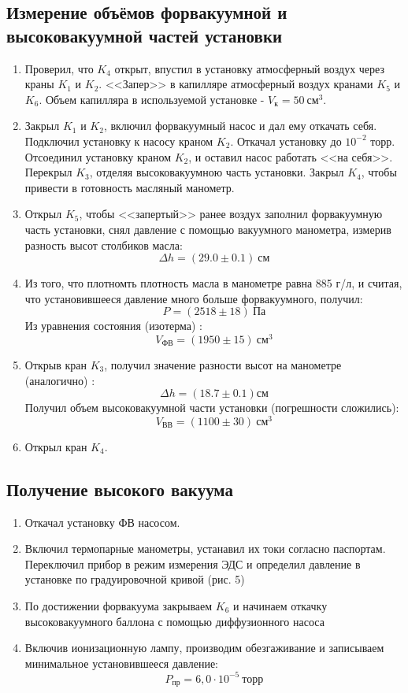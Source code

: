 \documentclass[12pt,a4paper]{article}
\begin{document}
\subsection*{Измерение объёмов форвакуумной и высоковакуумной частей установки}
    \begin{enumerate}
        \item Проверил, что $K_4$ открыт, впустил в установку атмосферный воздух через краны $K_1$ и $K_2$. <<Запер>> в капилляре атмосферный воздух кранами $K_5$ и $K_6$. Объем капилляра в используемой установке - $V_\text{к} = 50~ \text{см}^3.$
        \item Закрыл $K_1$ и $K_2$, включил форвакуумный насос и дал ему откачать себя. Подключил установку к насосу краном $K_2$. Откачал установку до $10^{-2}$ торр. Отсоединил установку краном $K_2$, и оставил насос работать <<на себя>>. Перекрыл  $K_3$, отделяя высоковакуумною часть установки. Закрыл $K_4$, чтобы привести в готовность масляный манометр.
        \item Открыл  $K_5$, чтобы <<запертый>> ранее воздух заполнил форвакуумную часть установки, снял давление с помощью вакуумного манометра, измерив разность высот столбиков масла:
        $$
        \Delta h = (29.0\pm0.1) ~\text{см}
        $$
        \item Из того, что плотномть плотность масла в манометре равна 885 г/л, и считая, что установившееся давление много больше форвакуумного, получил:
        $$
        P = (2518\pm18)~\text{Па}
        $$
        Из уравнения состояния (изотерма) :
        $$
        V_\text{ФВ} = (1950\pm15)~\text{см}^3
        $$
        \item Открыв кран $K_3$, получил значение разности высот на манометре (аналогично) :
        $$
        \Delta h = (18.7\pm0.1) \text{см}
        $$
        Получил объем высоковакуумной части установки (погрешности сложились):
        $$
        V_\text{ВВ} = (1100\pm30)~\text{см}^3
        $$
        \item Открыл кран $K_4$.
    \end{enumerate}

\newpage

\subsection*{Получение высокого вакуума}
    \begin{enumerate}
    \item Откачал установку ФВ насосом.
    \item Включил термопарные манометры, устанавил их токи согласно паспортам. Переключил прибор в режим измерения ЭДС и определил давление в установке по градуировочной кривой (рис. 5)
    \item По достижении форвакуума закрываем $K_6$ и начинаем откачку высоковакуумного баллона с помощью диффузионного насоса
    \item Включив ионизационную лампу, производим обезгаживание и записываем минимальное установившееся давление:
    $$P_{\text{пр}} = 6,0\cdot10^{-5} ~\text{торр}$$    
\end{enumerate}
\end{document}

